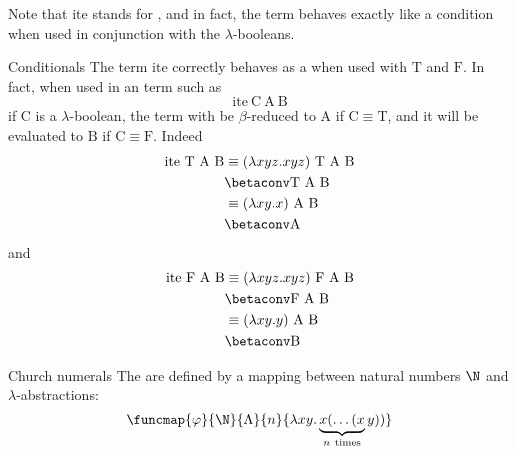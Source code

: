 \documentclass[a4paper, 12pt]{report}
\begin{document}
    Note that $\mathrm{ite}$ stands for , and in fact, the term behaves exactly like a condition when used in conjunction with the $\lambda$-booleans.

    \begin{framedobs}{Conditionals}
        The term $\mathrm{ite}$ correctly behaves as a  when used with $\mathrm T$ and $\mathrm F$. In fact, when used in an term such as $$\mathrm{ite} \ \mathrm C \ \mathrm A \ \mathrm B$$ if $\mathrm C$ is a $\lambda$-boolean, the term with be $\beta$-reduced to $\mathrm A$ if $\mathrm C \equiv \mathrm T$, and it will be evaluated to $\mathrm B$ if $\mathrm C \equiv \mathrm F$. Indeed
        \begin{equation*}
            \begin{split}
                \mathrm{ite} \  \mathrm T \ \mathrm A \ \mathrm B &\equiv (\lambda xyz.xyz) \ \mathrm T \ \mathrm A \ \mathrm B \\
                                                                  &\betaconv \mathrm T \ \mathrm A \ \mathrm B \\
                                                                  &\equiv (\lambda xy.x) \ \mathrm A \ \mathrm B \\
                                                                  &\betaconv \mathrm A \\
            \end{split}
        \end{equation*}
        and
        \begin{equation*}
            \begin{split}
                \mathrm{ite} \  \mathrm F \ \mathrm A \ \mathrm B &\equiv (\lambda xyz.xyz) \ \mathrm F \ \mathrm A \ \mathrm B \\
                                                                  &\betaconv \mathrm F \ \mathrm A \ \mathrm B \\
                                                                  &\equiv (\lambda xy.y) \ \mathrm A \ \mathrm B \\
                                                                  &\betaconv \mathrm B \\
            \end{split}
        \end{equation*}
    \end{framedobs}

    \begin{frameddefn}{Church numerals}
        The  are defined by a mapping between natural numbers $\N$ and $\lambda$-abstractions: $$\funcmap{\varphi}{\N}{\Lambda}{n}{\lambda xy. \underbrace{x ( \ldots ( x}_{n \ \mathrm{times}}y))}$$
    \end{frameddefn}
\end{document}
